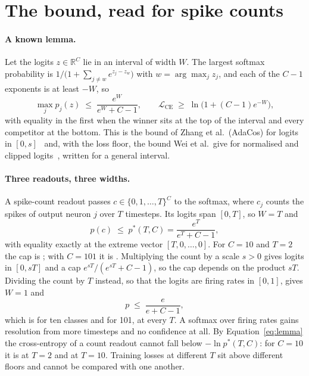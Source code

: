 \documentclass[10pt]{article}
\begin{document}
\section{The bound, read for spike counts}
\label{sec:bound}

\paragraph{A known lemma.}
Let the logits $z\in\mathbb{R}^{C}$ lie in an interval of width $W$. The largest softmax
probability is $1/\big(1+\sum_{j\ne w}e^{z_j-z_w}\big)$ with $w=\arg\max_j z_j$, and each of the
$C-1$ exponents is at least $-W$, so
\begin{equation}
\label{eq:lemma}
\max_j p_j(z) \;\le\; \frac{e^{W}}{e^{W}+C-1},
\qquad
\mathcal{L}_{\mathrm{CE}} \;\ge\; \ln\!\big(1+(C-1)e^{-W}\big),
\end{equation}
with equality in the first when the winner sits at the top of the interval and every competitor
at the bottom. This is the bound of Zhang et al.\ (AdaCos) for logits in $[0,s]$~\citep{zhang2019adacos} %
and, with the loss floor, the bound Wei et al.\ give for normalised and clipped
logits~\citep{wei2022logitnorm,wei2023logitclip}, written for a general interval. %

\paragraph{Three readouts, three widths.}
A spike-count readout passes $c\in\{0,1,\dots,T\}^{C}$ to the softmax, where $c_j$ counts the
spikes of output neuron $j$ over $T$ timesteps. Its logits span $[0,T]$, so $W=T$ and
\begin{equation}
\label{eq:ceiling}
p(c) \;\le\; p^{*}(T,C) = \frac{e^{T}}{e^{T}+C-1},
\end{equation}
with equality exactly at the extreme vector $[T,0,\dots,0]$. For $C=10$ and $T=2$ the cap
is \ceilTenTwo; with $C=101$ it is \ceilHundredOneTwo. Multiplying the count by a scale $s>0$ %
gives logits in $[0,sT]$ and a cap $e^{sT}/(e^{sT}+C-1)$, so the cap depends on the product $sT$. Dividing the count by $T$ instead, so that the logits are firing rates in
$[0,1]$, gives $W=1$ and
\begin{equation}
\label{eq:rate}
p \;\le\; \frac{e}{e+C-1},
\end{equation}
which is \rateCeilTen{} for ten classes and \rateCeilHundredOne{} for 101, at every $T$. A %
softmax over firing rates gains resolution from more timesteps and no confidence at all.
By Equation~\eqref{eq:lemma} the cross-entropy of a count readout cannot fall below
$-\ln p^{*}(T,C)$: for $C=10$ it is \floorTenTwo{} at $T=2$ and \floorTenTen{} at $T=10$. Training %
losses at different $T$ sit above different floors and cannot be compared with one another.
\end{document}
